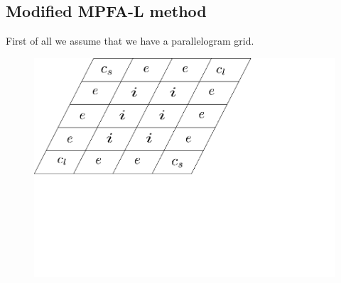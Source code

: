 \documentclass[../Main/main.tex]{subfiles}
\begin{document}
	\subsection{Modified MPFA-L method}
	First of all we assume that we have a parallelogram grid.
	\begin{figure}[H]\label{fig:paralellogram mesh}
		\centering
		\includegraphics[width=1\textwidth]{paralellogram_mesh.pdf}
	\end{figure}
\end{document}
